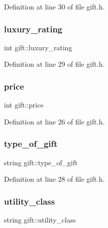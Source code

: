 Definition at line 30 of file gift.\+h.

\mbox{\label{classgift_aa0bfbb583b69e093e31558a1565cad9a}} 
\subsubsection{\texorpdfstring{luxury\+\_\+rating}{luxury\_rating}}
{\footnotesize\ttfamily int gift\+::luxury\+\_\+rating}



Definition at line 29 of file gift.\+h.

\mbox{\label{classgift_a0b47f2fdc5eb88daa269cc827324c931}} 
\subsubsection{\texorpdfstring{price}{price}}
{\footnotesize\ttfamily int gift\+::price}



Definition at line 26 of file gift.\+h.

\mbox{\label{classgift_a3feab4934d66fb383fe269fef66112ec}} 
\subsubsection{\texorpdfstring{type\+\_\+of\+\_\+gift}{type\_of\_gift}}
{\footnotesize\ttfamily string gift\+::type\+\_\+of\+\_\+gift}



Definition at line 28 of file gift.\+h.

\mbox{\label{classgift_a768493e393b6e4f89e3653b4229d8b6a}} 
\subsubsection{\texorpdfstring{utility\+\_\+class}{utility\_class}}
{\footnotesize\ttfamily string gift\+::utility\+\_\+class}



